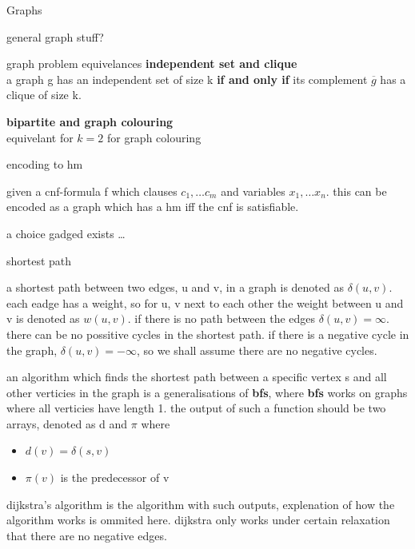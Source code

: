 \documentclass[12pt, letterpaper]{article}
\begin{document}
\begin{section}{Graphs}
\begin{subsection}{general graph stuff?}
\begin{subsubsection}{graph problem equivelances}
      \textbf{independent set and clique} \\
      a graph g has an independent set of size k \textbf{if and only if}
      its complement \(\overline{g}\) has a clique of size k.

      \textbf{bipartite and graph colouring} \\
      equivelant for \(k = 2\) for graph colouring

    \end{subsubsection}

    \begin{subsubsection}{encoding to hm}

      given a cnf-formula f which clauses \(c_{1}, \dots c_{m}\) and variables
      \(x_{1}, \dots x_{n}\). this can be encoded as a graph which has a hm iff
      the cnf is satisfiable.

      a choice gadged exists \ldots

    \end{subsubsection}

  \end{subsection}

  \begin{subsection}{shortest path}

    a shortest path between two edges, u and v, in a graph is denoted
    as \(\delta(u, v)\). each eadge has a weight, so for u, v next to each other
    the weight between u and v is denoted as \(w(u, v)\).
    if there is no path between the edges \(\delta(u, v) = \infty\).
    there can be no possitive cycles in the shortest path.
    if there is a negative cycle in the graph, \(\delta(u, v) = -\infty\), so
    we shall assume there are no negative cycles.

    an algorithm which finds the shortest path between a specific vertex s
    and all other verticies in the graph is a generalisations of
    \textbf{bfs}, where \textbf{bfs} works on graphs
    where all verticies have length 1.
    the output of such a function should be two arrays, denoted as d and \(\pi\)
    where
    \begin{itemize}
      \item \(d(v) = \delta(s, v)\)
      \item \(\pi(v)\) is the predecessor of v
    \end{itemize}
    dijkstra's algorithm is the algorithm with such outputs, explenation of
    how the algorithm works is ommited here. dijkstra only works under certain
    relaxation that there are no negative edges.


\end{subsection}
\end{section}
\end{document}
